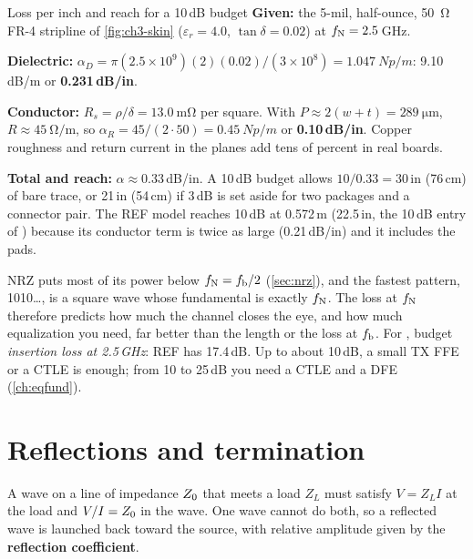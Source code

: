 \begin{example}{Loss per inch and reach for a 10\,dB budget}\label{we:ch3-loss}
\textbf{Given:} the 5-mil, half-ounce, \qty{50}{\ohm} FR-4 stripline of \cref{fig:ch3-skin} ($\varepsilon_r = 4.0$, $\tan\delta = 0.02$) at $f_\mathrm{N} = 2.5$\,GHz.

\textbf{Dielectric:} $\alpha_D = \pi(2.5\times10^9)(2)(0.02)/(3\times10^8) = \qty{1.047}{Np/m}$: 9.10\,dB/m or \textbf{0.231\,dB/in}.

\textbf{Conductor:} $R_s = \rho/\delta = \qty{13.0}{\milli\ohm}$ per square. With $P \approx 2(w+t) = \qty{289}{\micro\meter}$, $R \approx \qty{45}{\ohm\per\meter}$, so $\alpha_R = 45/(2\cdot50) = \qty{0.45}{Np/m}$ or \textbf{0.10\,dB/in}. Copper roughness and return current in the planes add tens of percent in real boards.

\textbf{Total and reach:} $\alpha \approx 0.33$\,dB/in. A 10\,dB budget allows $10/0.33 = 30$\,in (76\,cm) of bare trace, or 21\,in (54\,cm) if 3\,dB is set aside for two packages and a connector pair. The REF model reaches 10\,dB at 0.572\,m (22.5\,in, the 10\,dB entry of ) because its conductor term is twice as large (0.21\,dB/in) and it includes the pads.
\end{example}

\begin{insight}
NRZ puts most of its power below $f_\mathrm{N} = f_\mathrm{b}/2$ (\cref{sec:nrz}), and the fastest pattern, 1010\ldots, is a square wave whose fundamental is exactly $f_\mathrm{N}$. The loss at $f_\mathrm{N}$ therefore predicts how much the channel closes the eye, and how much equalization you need, far better than the length or the loss at $f_\mathrm{b}$. For \OS{}, budget \emph{insertion loss at 2.5\,GHz}: REF has 17.4\,dB. Up to about 10\,dB, a small TX FFE or a CTLE is enough; from 10 to 25\,dB you need a CTLE and a DFE (\cref{ch:eqfund}).
\end{insight}

\section{Reflections and termination}\label{sec:reflections}

A wave on a line of impedance $Z_0$ that meets a load $Z_L$ must satisfy $V = Z_L I$ at the load and $V/I = Z_0$ in the wave. One wave cannot do both, so a reflected wave is launched back toward the source, with relative amplitude given by the \textbf{reflection coefficient}.

